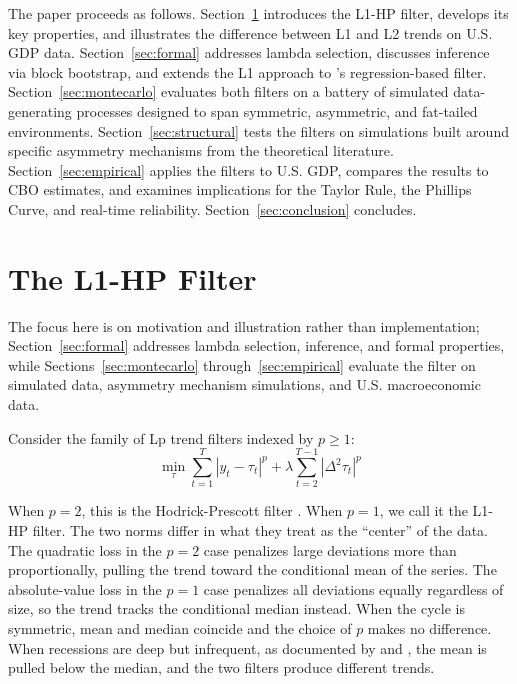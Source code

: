 \documentclass[10pt]{article}
\begin{document}
The paper proceeds as follows. Section~\ref{sec:l1hp} introduces the L1-HP filter, develops its key properties, and illustrates the difference between L1 and L2 trends on U.S. GDP data. Section~\ref{sec:formal} addresses lambda selection, discusses inference via block bootstrap, and extends the L1 approach to \citet{hamilton2018}'s regression-based filter. Section~\ref{sec:montecarlo} evaluates both filters on a battery of simulated data-generating processes designed to span symmetric, asymmetric, and fat-tailed environments. Section~\ref{sec:structural} tests the filters on simulations built around specific asymmetry mechanisms from the theoretical literature. Section~\ref{sec:empirical} applies the filters to U.S. GDP, compares the results to CBO estimates, and examines implications for the Taylor Rule, the Phillips Curve, and real-time reliability. Section~\ref{sec:conclusion} concludes.


\section{The L1-HP Filter}
\label{sec:l1hp}

The focus here is on motivation and illustration rather than implementation; Section~\ref{sec:formal} addresses lambda selection, inference, and formal properties, while Sections~\ref{sec:montecarlo} through~\ref{sec:empirical} evaluate the filter on simulated data, asymmetry mechanism simulations, and U.S. macroeconomic data.

Consider the family of Lp trend filters indexed by $p \geq 1$:
\begin{equation}
\label{eq:hp_lp}
\min_{\tau} \sum_{t=1}^{T} |y_t - \tau_t|^p + \lambda \sum_{t=2}^{T-1} |\Delta^2 \tau_t|^p
\end{equation}

When $p = 2$, this is the Hodrick-Prescott filter \citep{hodrick_prescott1997}. When $p = 1$, we call it the L1-HP filter. The two norms differ in what they treat as the ``center'' of the data. The quadratic loss in the $p = 2$ case penalizes large deviations more than proportionally, pulling the trend toward the conditional mean of the series. The absolute-value loss in the $p = 1$ case penalizes all deviations equally regardless of size, so the trend tracks the conditional median instead. When the cycle is symmetric, mean and median coincide and the choice of $p$ makes no difference. When recessions are deep but infrequent, as documented by \citet{neftci1984} and \citet{sichel1993}, the mean is pulled below the median, and the two filters produce different trends.
\end{document}

